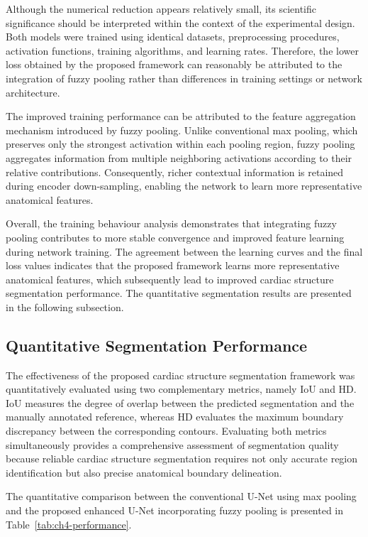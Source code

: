 Although the numerical reduction appears relatively small, its scientific significance should be interpreted within the context of the experimental design. Both models were trained using identical datasets, preprocessing procedures, activation functions, training algorithms, and learning rates. Therefore, the lower loss obtained by the proposed framework can reasonably be attributed to the integration of fuzzy pooling rather than differences in training settings or network architecture.

The improved training performance can be attributed to the feature aggregation mechanism introduced by fuzzy pooling. Unlike conventional max pooling, which preserves only the strongest activation within each pooling region, fuzzy pooling aggregates information from multiple neighboring activations according to their relative contributions. Consequently, richer contextual information is retained during encoder down-sampling, enabling the network to learn more representative anatomical features.

Overall, the training behaviour analysis demonstrates that integrating fuzzy pooling contributes to more stable convergence and improved feature learning during network training. The agreement between the learning curves and the final loss values indicates that the proposed framework learns more representative anatomical features, which subsequently lead to improved cardiac structure segmentation performance. The quantitative segmentation results are presented in the following subsection.

\subsection{Quantitative Segmentation Performance}
\label{subsec:ch4-quantitative}

The effectiveness of the proposed cardiac structure segmentation framework was quantitatively evaluated using two complementary metrics, namely IoU and HD. IoU measures the degree of overlap between the predicted segmentation and the manually annotated reference, whereas HD evaluates the maximum boundary discrepancy between the corresponding contours. Evaluating both metrics simultaneously provides a comprehensive assessment of segmentation quality because reliable cardiac structure segmentation requires not only accurate region identification but also precise anatomical boundary delineation.

The quantitative comparison between the conventional U-Net using max pooling and the proposed enhanced U-Net incorporating fuzzy pooling is presented in Table~\ref{tab:ch4-performance}.

